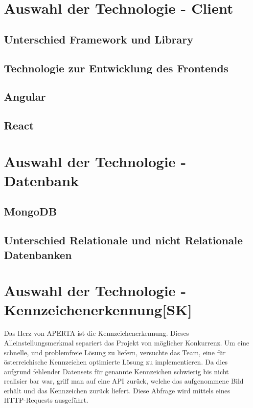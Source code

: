 \section{Auswahl der Technologie - Client}

\subsection{Unterschied Framework und Library}
\subsection{Technologie zur Entwicklung des Frontends}
\subsection{Angular}
\subsection{React}

\section{Auswahl der Technologie - Datenbank}

\subsection{MongoDB}
\subsection{Unterschied Relationale und nicht Relationale Datenbanken}


\section{Auswahl der Technologie - Kennzeichenerkennung[SK]}
Das Herz von APERTA ist die Kennzeichenerkennung. Dieses Alleinstellungsmerkmal separiert das Projekt von möglicher Konkurrenz. Um eine schnelle, und problemfreie Lösung zu liefern, versuchte das Team, eine für österreichische Kennzeichen optimierte Lösung zu implementieren. Da dies aufgrund fehlender Datensets für genannte Kennzeichen schwierig bis nicht realisier bar war, griff man auf eine API zurück, welche das aufgenommene Bild erhält und das Kennzeichen zurück liefert. Diese Abfrage wird mittels eines HTTP-Requests ausgeführt.

